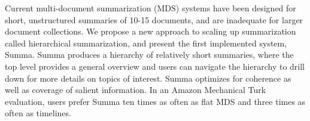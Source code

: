 Current multi-document summarization (MDS) systems have been designed for short, unstructured summaries of 10-15 documents, and are inadequate for larger document collections. We propose a new approach to scaling up summarization called hierarchical summarization, and present the first implemented system, Summa. Summa produces a hierarchy of relatively short summaries, where the top level provides a general overview and  users can navigate the hierarchy to drill down for more details on topics of interest.  Summa optimizes for coherence as well as coverage of salient information.  In an Amazon Mechanical Turk evaluation, users prefer Summa ten times as often as flat MDS and three times as often as timelines.

